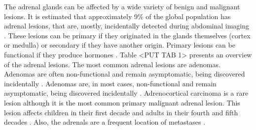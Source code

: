\documentclass{article}
\begin{document}
The adrenal glands can be affected by a wide variety of benign and malignant
lesions. It is estimated that approximately 9\% of the global population has
adrenal lesions, that are, mostly, incidentally detected during abdominal
imaging \cite{Dhamija2015}. These lesions can be primary if they originated in
the glands themselves (cortex or medulla) or secondary if they have another origin. Primary
lesions can be functional if they produce hormones \cite{Panda2015}. Table <PUT
TAB 1> presents an overview of the adrenal lesions. The most common adrenal
lesions are adenomas. Adenomas are often non-functional and remain asymptomatic,
being discovered incidentally \cite{Wang2018}. Adenomas are, in most cases,
non-functional and remain asymptomatic, being discovered incidentally
\cite{Platzek2019}. Adrenocortical carcinoma is a rare lesion although it is the
most common primary malignant adrenal lesion. This lesion affects children in
their first decade and adults in their fourth and fifth decades
\cite{Panda2015}. Also, the adrenals are a frequent location of metastases
\cite{Platzek2019}.
\end{document}
